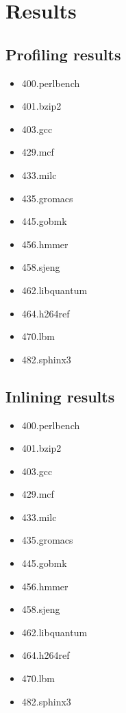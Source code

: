
\clearpage
\section{Results}
\label{sec:res}


\subsection{Profiling results}
\label{sub:res:profiling}


\begin{multicols}{2}
	\begin{itemize}
		\item 400.perlbench
		\item 401.bzip2
		\item 403.gcc
		\item 429.mcf
		\item 433.milc
		\item 435.gromacs
		\item 445.gobmk
		\item 456.hmmer
		\item 458.sjeng
		\item 462.libquantum
		\item 464.h264ref
		\item 470.lbm
		\item 482.sphinx3
	\end{itemize}
\end{multicols}

\subsection{Inlining results}
\label{sub:res:inlining}


\begin{multicols}{2}
	\begin{itemize}
		\item 400.perlbench
		\item 401.bzip2
		\item 403.gcc
		\item 429.mcf
		\item 433.milc
		\item 435.gromacs
		\item 445.gobmk
		\item 456.hmmer
		\item 458.sjeng
		\item 462.libquantum
		\item 464.h264ref
		\item 470.lbm
		\item 482.sphinx3
	\end{itemize}
\end{multicols}

